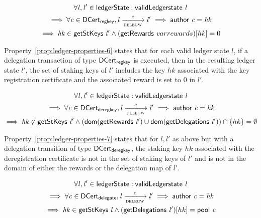 \begin{property}
  \begin{multline*}
    \forall \var{l}, \var{l'} \in \ledgerState: \applyFun{validLedgerstate}{l}\\
    \implies \forall \var{c} \in \DCertRegKey, \var{l} \trans{delegw}{c} \var{l'}
    \implies \applyFun{author}{c} = \var{hk}\\ \implies
    \var{hk} \in \applyFun{getStKeys}{l'} \wedge
    (\applyFun{getRewards}var{rewards})[hk] = 0
  \end{multline*}
  \label{prop:ledger-properties-6}
\end{property}

Property~\ref{prop:ledger-properties-6} states that for each valid ledger state
$l$, if a delegation transaction of type $\mathsf{DCert_{regkey}}$ is executed, then in the
resulting ledger state $l'$, the set of staking keys of $l'$ includes the key
$hk$ associated with the key registration certificate and the associated reward
is set to 0 in $l'$.

\begin{property}
  \begin{multline*}
    \forall \var{l}, \var{l'} \in \ledgerState: \applyFun{validLedgerstate}{l}\\
    \implies \forall \var{c} \in \DCertDeRegKey, \var{l} \trans{delegw}{c} \var{l'}
    \implies \applyFun{author}{c} = \var{hk}\\ \implies
    \var{hk} \not\in \applyFun{getStKeys}{l'} \wedge
    (\fun{dom}(\applyFun{getRewards}{l'}) \cup
    \fun{dom}(\applyFun{getDelegations}{l'})) \cap \{hk\} = \emptyset
  \end{multline*}
  \label{prop:ledger-properties-7}
\end{property}

Property~\ref{prop:ledger-properties-7} states that for $l, l'$ as above but
with a delegation transition of type $\mathsf{DCert_{deregkey}}$, the staking key $hk$
associated with the deregistration certificate is not in the set of staking keys
of $l'$ and is not in the domain of either the rewards or the delegation map
of $l'$.

\begin{property}
  \begin{multline*}
    \forall \var{l}, \var{l'} \in \ledgerState: \applyFun{validLedgerstate}{l}\\
    \implies \forall \var{c} \in \DCertDeleg, \var{l} \trans{delegw}{c} \var{l'}
    \implies \applyFun{author}{c} = \var{hk}\\ \implies
    \var{hk} \in \applyFun{getStKeys}{l} \wedge
    (\applyFun{getDelegations}{l'})[hk] = \applyFun{pool}{c}
  \end{multline*}
  \label{prop:ledger-properties-8}
\end{property}

